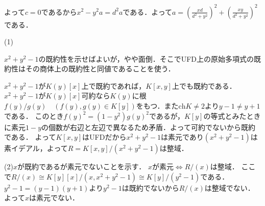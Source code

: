 \documentclass[
		book,
		head_space=20mm,
		foot_space=20mm,
		gutter=10mm,
		line_length=190mm
]{jlreq}
\begin{document}
よって$c=0$であるから$x^2-y^2a=d^2a$である．よって$a=\left( \frac{xd}{d^2+y^2} \right)^2+\left( \frac{xy}{d^2+y^2} \right)^2$である．

(1)\begin{tcolorbox}[blanker,breakable,
	left=3mm,right=3mm,
	top=3mm,bottom=3mm,
	before skip=15pt,after skip=15pt,
	borderline vertical={1pt}{0pt}{black,dotted}]
	$x^2+y^2-1$の既約性を示せばよいが，やや面倒．そこでUFD上の原始多項式の既約性はその商体上の既約性と同値であることを使う．
	\end{tcolorbox}
$x^2+y^2-1$が$ K(y)[x]$上で既約であれば，$K[x,y]$上でも既約である．
$x^2+y^2-1$が$ K(y)[x]$可約なら$K(y)$に根$f(y)/g(y)\quad(f(y),g(y)\in K[y])$をもつ．また$\mathrm{ch} K\neq 2$より$y-1\neq y+1$である．
このとき$f(y)^2=(1-y^2)g(y)^2$であるが，$K[y]$の等式とみたときに素元$1-y$の個数が右辺と左辺で異なるため矛盾．よって可約でないから既約である．
よって$K[x,y]$はUFDだから$x^2+y^2-1$は素元であり$(x^2+y^2-1)$は素イデアル，よって$R=K[x,y]/(x^2+y^2-1)$は整域．

(2)$x$が既約であるが素元でないことを示す．
$x$が素元$\Leftrightarrow$$R/(x)$は整域．
ここで$R/(x)\cong K[y][x]/(x,x^2+y^2-1)\cong K[y]/(y^2-1)$である．
$y^2-1=(y-1)(y+1)$より$y^2-1$は既約でないから$R/(x)$は整域でない．よって$x$は素元でない．
\end{document}
